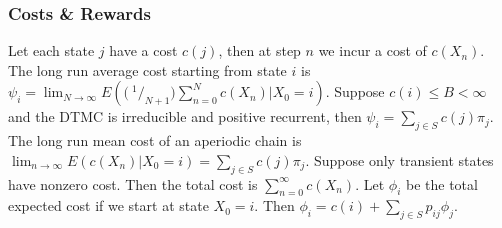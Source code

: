 \subsubsection*{Costs \& Rewards}
 Let each state $j$ have a cost $c(j)$, then at step $n$ we incur a cost of $c(X_n)$.
 The long run average cost starting from state $i$ is 
$\psi_i = \lim_{N \to \infty} E\left(\bigr(\ ^1/_{N+1}\bigl) \sum^N_{n = 0} c(X_n) \big| X_0 = i\right).$
 Suppose $c(i) \le B < \infty$ and the DTMC is irreducible and positive recurrent, then $\psi_i = \sum_{j \in S} c(j) \pi_j$.
 The long run mean cost of an aperiodic chain is 
$\lim_{n \to \infty} E(c(X_n)|X_0 = i) = \sum_{j \in S} c(j)\pi_j$. 
 Suppose only transient states have nonzero cost. Then the total cost is $\sum^{\infty}_{n = 0} c(X_n)$. Let $\phi_i$ be the total expected cost if we start at state $X_0 = i$. Then 
$\phi_i = c(i) + \sum_{j \in S} p_{ij}\phi_j$.